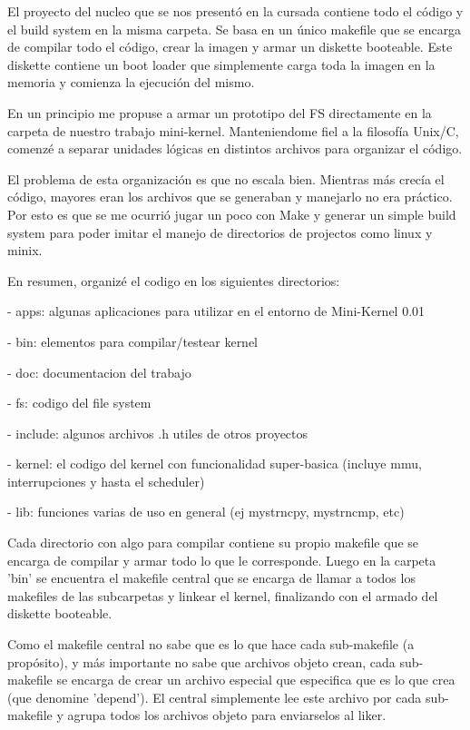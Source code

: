 El proyecto del nucleo que se nos presentó en la cursada contiene todo el código
y el build system en la misma carpeta. Se basa en un único makefile que se
encarga de compilar todo el código, crear la imagen y armar un diskette booteable.
Este diskette contiene un boot loader que simplemente carga toda la imagen en la
memoria y comienza la ejecución del mismo.

En un principio me propuse a armar un prototipo del FS directamente en la
carpeta de nuestro trabajo mini-kernel. Manteniendome fiel a la filosofía
Unix/C, comenzé a separar unidades lógicas en distintos archivos para organizar
el código.

El problema de esta organización es que no escala bien. Mientras más crecía el
código, mayores eran los archivos que se generaban y manejarlo no era práctico.
Por esto es que se me ocurrió jugar un poco con Make y generar un simple build
system para poder imitar el manejo de directorios de projectos como linux y
minix.

En resumen, organizé el codigo en los siguientes directorios:

- apps: algunas aplicaciones para utilizar en el entorno de Mini-Kernel 0.01

- bin: elementos para compilar/testear kernel

- doc: documentacion del trabajo

- fs: codigo del file system

- include: algunos archivos .h utiles de otros proyectos

- kernel: el codigo del kernel con funcionalidad super-basica (incluye mmu,
interrupciones y hasta el scheduler)

- lib: funciones varias de uso en general (ej mystrncpy, mystrncmp, etc)

Cada directorio con algo para compilar contiene su propio makefile que se
encarga de compilar y armar todo lo que le corresponde. Luego en la carpeta
'bin' se encuentra el makefile central que se encarga de llamar a todos los
makefiles de las subcarpetas y linkear el kernel, finalizando con el armado del
diskette booteable.

Como el makefile central no sabe que es lo que hace cada sub-makefile (a
propósito), y más importante no sabe que archivos objeto crean, cada
sub-makefile se encarga de crear un archivo especial que especifica que es lo
que crea (que denomine 'depend'). El central simplemente lee este archivo por
cada sub-makefile y agrupa todos los archivos objeto para enviarselos al liker.

